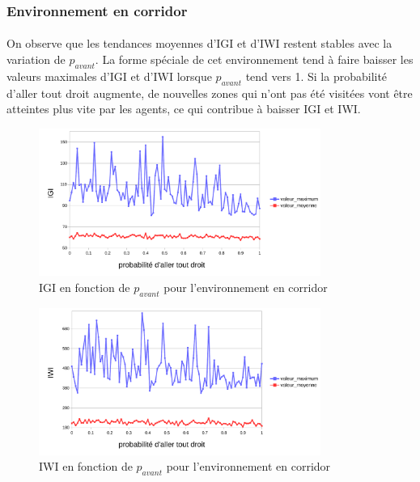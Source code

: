 \documentclass{article}
\begin{document}
    \subsubsection{Environnement en corridor}
    \paragraph{}On observe que les tendances moyennes d'IGI et d'IWI restent stables avec la variation de $p_{avant}$. La forme spéciale de cet environnement tend à faire baisser les valeurs maximales d'IGI et d'IWI lorsque $p_{avant}$ tend  vers 1.
    Si la probabilité d'aller tout droit augmente, de nouvelles zones qui n'ont pas été visitées vont être atteintes plus vite par les agents, ce qui contribue à baisser IGI et IWI.
    \begin{figure}[!h]
        \begin{center}
            \includegraphics[width = 0.82\textwidth]{graphes pdf/variance go-ahead IGI corridor.pdf}
            \caption{IGI en fonction de $p_{avant}$ pour l'environnement en corridor}
        \end{center}
    \end{figure}
    \begin{figure}[!h]
        \begin{center}
            \includegraphics[width = 0.82\textwidth]{graphes pdf/variance go-ahead IWI corridor.pdf}
            \caption{IWI en fonction de $p_{avant}$ pour l'environnement en corridor}
        \end{center}
    \end{figure}
    \newpage
\end{document}
